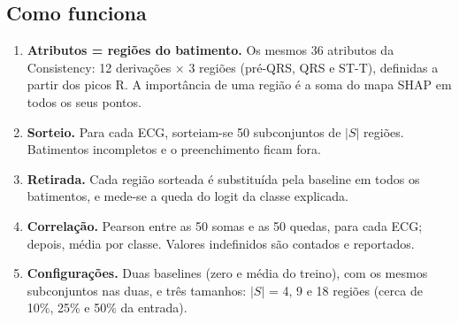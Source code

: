 \documentclass[11pt,a4paper]{article}
\begin{document}
\subsection{Como funciona}
\begin{enumerate}
\item \textbf{Atributos = regiões do batimento.} Os mesmos 36 atributos da Consistency: 12 derivações × 3 regiões (pré-QRS, QRS e ST-T), definidas a partir dos picos R. A importância de uma região é a soma do mapa SHAP em todos os seus pontos.
\item \textbf{Sorteio.} Para cada ECG, sorteiam-se 50 subconjuntos de $|S|$ regiões. Batimentos incompletos e o preenchimento ficam fora.
\item \textbf{Retirada.} Cada região sorteada é substituída pela baseline em todos os batimentos, e mede-se a queda do logit da classe explicada.
\item \textbf{Correlação.} Pearson entre as 50 somas e as 50 quedas, para cada ECG; depois, média por classe. Valores indefinidos são contados e reportados.
\item \textbf{Configurações.} Duas baselines (zero e média do treino), com os mesmos subconjuntos nas duas, e três tamanhos: $|S|$ = 4, 9 e 18 regiões (cerca de 10\%, 25\% e 50\% da entrada).
\end{enumerate}
\end{document}
